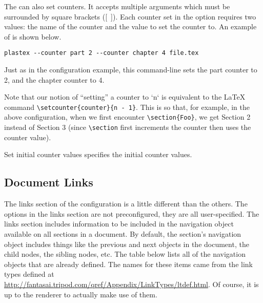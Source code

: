 The  can also set counters.  It accepts multiple
arguments which must be surrounded by square brackets ([~]).
Each counter set in the 
option requires two values: the name of the counter and the value to
set the counter to.  An example of  is shown below.
\begin{verbatim}
plastex --counter part 2 --counter chapter 4 file.tex
\end{verbatim}

Just as in the configuration example, this command-line sets the
part counter to 2, and the chapter counter to 4.

Note that our notion of ``setting'' a counter to `n` is equivalent to
the \LaTeX{} command \verb!\setcounter{counter}{n - 1}!. This is so that, for
example, in the above configuration, when we first encounter
\verb!\section{Foo}!, we get Section 2 instead of Section 3 (since
\verb!\section! first increments the counter then uses the counter value).

\begin{configuration}{Set initial counter values}
specifies the initial counter values.
\end{configuration}


\subsection{Document Links\label{sec:config-links}}

The links section of the configuration is a little different than the
others.  The options in the links section are not preconfigured, they
are all user-specified.  The links section includes information
to be included in the navigation object available on all sections in
a document.  By default, the section's navigation object includes things
like the previous and next objects in the document, the child nodes,
the sibling nodes, etc.  The table below lists all of the navigation
objects that are already defined.  The names for these items came from
the link types defined at \url{http://fantasai.tripod.com/qref/Appendix/LinkTypes/ltdef.html}.  Of course, it is up to the renderer to actually make use
of them.

